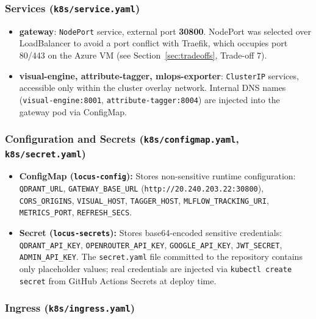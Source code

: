 \documentclass[12pt]{article}
\begin{document}
\subsubsection{Services (\texttt{k8s/service.yaml})}

\begin{itemize}[leftmargin=*]
    \item \textbf{gateway}: \texttt{NodePort} service, external port \textbf{30800}. NodePort was selected over LoadBalancer to avoid a port conflict with Traefik, which occupies port 80/443 on the Azure VM (see Section~\ref{sec:tradeoffs}, Trade-off 7).
    \item \textbf{visual-engine, attribute-tagger, mlops-exporter}: \texttt{ClusterIP} services, accessible only within the cluster overlay network. Internal DNS names (\texttt{visual-engine:8001}, \texttt{attribute-tagger:8004}) are injected into the gateway pod via ConfigMap.
\end{itemize}

\subsubsection{Configuration and Secrets (\texttt{k8s/configmap.yaml}, \texttt{k8s/secret.yaml})}
\label{sec:secrets}

\begin{itemize}[leftmargin=*]
    \item \textbf{ConfigMap (\texttt{locus-config}):} Stores non-sensitive runtime configuration: \texttt{QDRANT\_URL}, \texttt{GATEWAY\_BASE\_URL} (\texttt{http://20.240.203.22:30800}), \texttt{CORS\_ORIGINS}, \texttt{VISUAL\_HOST}, \texttt{TAGGER\_HOST}, \texttt{MLFLOW\_TRACKING\_URI}, \texttt{METRICS\_PORT}, \texttt{REFRESH\_SECS}.
    \item \textbf{Secret (\texttt{locus-secrets}):} Stores base64-encoded sensitive credentials: \texttt{QDRANT\_API\_KEY}, \texttt{OPENROUTER\_API\_KEY}, \texttt{GOOGLE\_API\_KEY}, \texttt{JWT\_SECRET}, \texttt{ADMIN\_API\_KEY}. The \texttt{secret.yaml} file committed to the repository contains only placeholder values; real credentials are injected via \texttt{kubectl create secret} from GitHub Actions Secrets at deploy time.
\end{itemize}

\subsubsection{Ingress (\texttt{k8s/ingress.yaml})}
\end{document}
